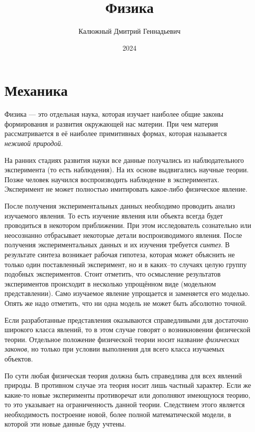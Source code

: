 \documentclass[10pt]{extbook}
\title{Физика}
\author{Калюжный Дмитрий Геннадьевич}
\date{2024}
\begin{document}
\maketitle
\tableofcontents
\newpage

\chapter{Механика}%

Физика --- это отдельная наука, которая изучает наиболее общие законы
формирования и развития окружающей нас материи. При чем материя рассматривается
в её наиболее примитивных формах, которая называется \emph{неживой природой}.

На ранних стадиях развития науки все данные получались из наблюдательного
эксперимента (то есть наблюдения). На их основе выдвигались научные теории.
Позже человек научился воспроизводить наблюдение в экспериментах. Эксперимент
не может полностью имитировать какое-либо физическое явление.

После получения экспериментальных данных необходимо проводить анализ изучаемого
явления. То есть изучение явления или объекта всегда будет проводиться в
некотором приближении. При этом исследователь сознательно или неосознанно
отбрасывает некоторые детали воспроизводимого явления. После получения
экспериментальных данных и их изучения требуется \emph{синтез}. В результате
синтеза возникает рабочая гипотеза, которая может объяснить не только один
поставленный эксперимент, но и в каких--то случаях целую группу подобных
экспериментов. Стоит отметить, что осмысление результатов экспериментов
происходит в несколько упрощённом виде (модельном представлении). Само
изучаемое явление упрощается и заменяется его моделью. Опять же надо отметить,
что ни одна модель не может быть абсолютно точной.

Если разработанные представления оказываются справедливыми для достаточно
широкого класса явлений, то в этом случае говорят о возникновении физической
теории. Отдельное положение физической теории носит название \emph{физических
	законов}, но только при условии выполнения для всего класса изучаемых объектов.

По сути любая физическая теория должна быть справедлива для всех явлений
природы. В противном случае эта теория носит лишь частный характер. Если же
какие-то новые эксперименты противоречат или дополняют имеющуюся теорию, то
это указывает на ограниченность данной теории. Следствием этого является
необходимость построение новой, более полной математической модели, в
которой эти новые данные буду учтены.
\end{document}
